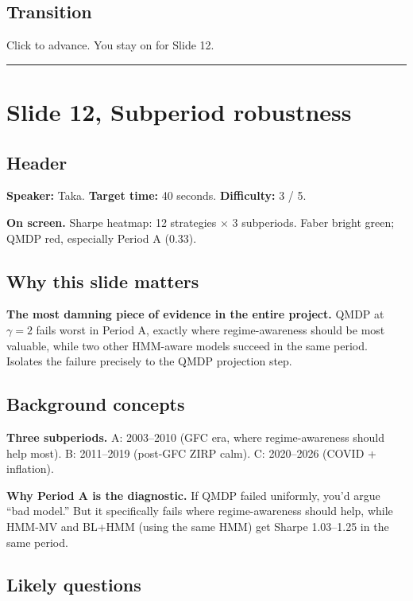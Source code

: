 \documentclass[11pt]{article}
\begin{document}
\subsection*{Transition}

Click to advance. You stay on for Slide 12.

\bigskip\hrule

\section*{Slide 12, Subperiod robustness}

\subsection*{Header}

\textbf{Speaker:} Taka. \quad\textbf{Target time:} 40 seconds. \quad\textbf{Difficulty:} 3 / 5.

\textbf{On screen.} Sharpe heatmap: 12 strategies $\times$ 3 subperiods. Faber bright green; QMDP red, especially Period A (0.33).

\subsection*{Why this slide matters}

\textbf{The most damning piece of evidence in the entire project.} QMDP at $\gamma = 2$ fails worst in Period A, exactly where regime-awareness should be most valuable, while two other HMM-aware models succeed in the same period. Isolates the failure precisely to the QMDP projection step.

\subsection*{Background concepts}

\textbf{Three subperiods.} A: 2003--2010 (GFC era, where regime-awareness should help most). B: 2011--2019 (post-GFC ZIRP calm). C: 2020--2026 (COVID + inflation).

\textbf{Why Period A is the diagnostic.} If QMDP failed uniformly, you'd argue ``bad model.'' But it specifically fails where regime-awareness should help, while HMM-MV and BL+HMM (using the same HMM) get Sharpe 1.03--1.25 in the same period.

\subsection*{Likely questions}
\end{document}
